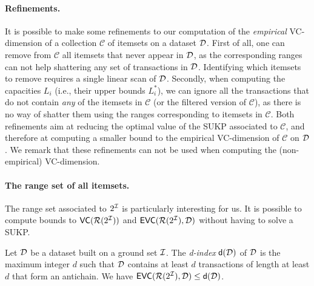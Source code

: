 \paragraph{Refinements.} It is possible to make some refinements to our
computation of the \emph{empirical} VC-dimension of a collection $\mathcal{C}$ of
itemsets on a dataset ${\cal D}$. First of all, one can remove from $\mathcal{C}$ all
itemsets that never appear in ${\cal D}$, as the corresponding ranges can not help
shattering any set of transactions in ${\cal D}$. Identifying which itemsets to
remove requires a single linear scan of ${\cal D}$. Secondly, when computing the
capacities $L_i$ (i.e., their upper bounds $L_i^*$), we can ignore all the
transactions that do not contain \emph{any} of the itemsets in $\mathcal{C}$ (or
the filtered version of $\mathcal{C}$), as there is no way of shatter them using
the ranges corresponding to itemsets in $\mathcal{C}$. Both refinements aim at
reducing the optimal value of the SUKP associated to $\mathcal{C}$, and
therefore at computing a smaller bound to the empirical VC-dimension of
$\mathcal{C}$ on ${\cal D}$. We remark that these refinements can not be used when
computing the (non-empirical) VC-dimension.

\paragraph{The range set of all itemsets.}
The range set associated to $2^{\cal I}$
is particularly interesting for us. It is possible  %
to compute bounds to $\mathsf{VC}(\mathcal{R}(2^{\cal I}))$ and
$\mathsf{EVC}(\mathcal{R}(2^{\cal I}), {\cal D})$ without having to solve a SUKP.

\begin{theorem}\label{thm:empvcdimubfirst}
  Let ${\cal D}$ be a dataset built on a
  ground set ${\cal I}$. The
  \emph{d-index} $\mathsf{d}({\cal D})$ of ${\cal D}$ is the maximum integer $d$ such that
  ${\cal D}$ contains at least $d$ transactions of length at least $d$ %
  that form an antichain. %
  We have $\mathsf{EVC}(\mathcal{R}(2^{\cal I}),{\cal D})\le \mathsf{d}({\cal D})$.
\end{theorem}


